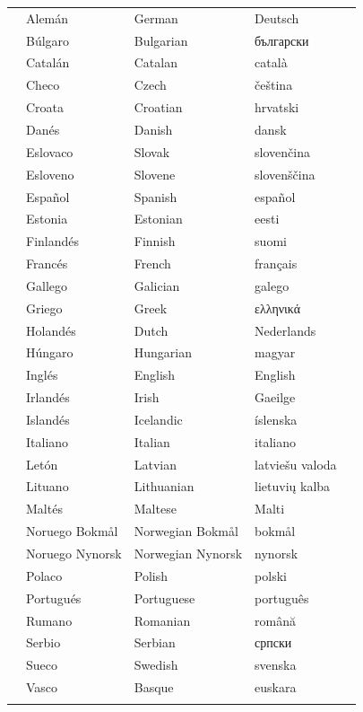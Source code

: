 \centering
\setlength{\tabcolsep}{2.4em}
\begin{small}
\begin{tabularx}{\textwidth}{lllll} \toprule\addlinespace
  &Alemán & German & Deutsch& \\
  &Búlgaro & Bulgarian & български& \\
  &Catalán & Catalan & català& \\
  &Checo & Czech & čeština& \\
  &Croata & Croatian & hrvatski& \\
  &Danés & Danish & dansk& \\
  &Eslovaco & Slovak & slovenčina& \\
  &Esloveno & Slovene & slovenščina& \\
  &Español & Spanish & español& \\
  &Estonia & Estonian & eesti& \\
  &Finlandés & Finnish & suomi& \\
  &Francés & French & français& \\
  &Gallego & Galician & galego& \\
  &Griego & Greek & ελληνικά& \\
  &Holandés & Dutch & Nederlands& \\
  &Húngaro & Hungarian & magyar& \\
  &Inglés & English & English& \\
  &Irlandés & Irish & Gaeilge& \\
  &Islandés & Icelandic & íslenska& \\
  &Italiano & Italian & italiano& \\
  &Letón & Latvian & latviešu valoda& \\
  &Lituano & Lithuanian & lietuvių kalba& \\
  &Maltés & Maltese & Malti& \\
  &Noruego Bokmål & Norwegian Bokmål & bokmål& \\
  &Noruego Nynorsk & Norwegian Nynorsk & nynorsk& \\
  &Polaco & Polish & polski& \\
  &Portugués & Portuguese & português& \\
  &Rumano & Romanian & română& \\
  &Serbio & Serbian & српски& \\
  &Sueco & Swedish & svenska& \\
  &Vasco & Basque & euskara& \\ \addlinespace \bottomrule
\end{tabularx}
\end{small}
